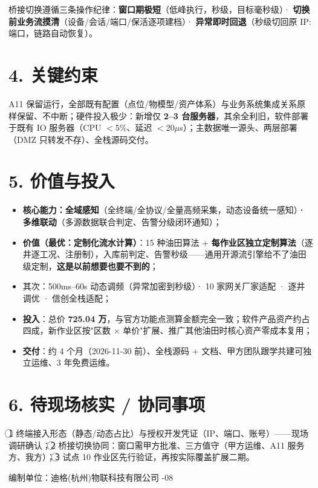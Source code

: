 \documentclass[10pt,a4paper]{ctexart}
\begin{document}
桥接切换遵循三条操作纪律：\textbf{窗口期极短}（低峰执行，秒级，目标毫秒级）· \textbf{切换前业务流摸清}（设备/会话/端口/保活逐项建档）· \textbf{异常即时回退}（秒级切回原 IP:端口，链路自动恢复）。

\section*{4. 关键约束}

A11 保留运行，全部既有配置（点位/物模型/资产体系）与业务系统集成关系原样保留、不中断；硬件投入极少：新增仅 \textbf{2--3 台服务器}，其余全利旧，软件部署于既有 IO 服务器（CPU $<$5\%、延迟 $<$20$\mu$s）；主数据唯一源头、两层部署（DMZ 只转发不存）、全栈源码交付。

\section*{5. 价值与投入}

\begin{itemize}[leftmargin=*, itemsep=1pt]
  \item \textbf{核心能力：全域感知}（全终端/全协议/全量高频采集，动态设备统一感知）\textbf{· 多维联动}（多源数据联合判定、告警分级闭环通知）；
  \item \textbf{价值（最优：定制化流水计算）}：15 种油田算法 + \textbf{每作业区独立定制算法}（逐井逐工况、注册制），入库前判定、告警秒级——通用开源流引擎给不了油田级定制，\textbf{这是以前想要也要不到的}；
  \item 其次：500ms--60s 动态调频（异常加密到秒级）· 10 家网关厂家适配 · 逐井调优 · 信创全栈适配；
  \item \textbf{投入}：总价 \textbf{725.04 万}，与官方功能点测算金额完全一致；软件产品资产约占四成，新作业区按"区数 $\times$ 单价"扩展、推广其他油田时核心资产零成本复用；
  \item \textbf{交付}：约 4 个月（2026-11-30 前）、全栈源码 + 文档、甲方团队跟学共建可独立运维、3 年免费运维。
\end{itemize}

\section*{6. 待现场核实 / 协同事项}

\textcircled{1} 终端接入形态（静态/动态占比）与授权开发凭证（IP、端口、账号）——现场调研确认；\textcircled{2} 桥接切换协同：窗口需甲方批准、三方值守（甲方运维、A11 服务方、我方）；\textcircled{3} 试点 10 作业区先行验证，再按实际覆盖扩展二期。

\vspace{0.5em}
\noindent\hrulefill

\begin{center}
\small 编制单位：迪格(杭州)物联科技有限公司 -08
\end{center}
\end{document}
